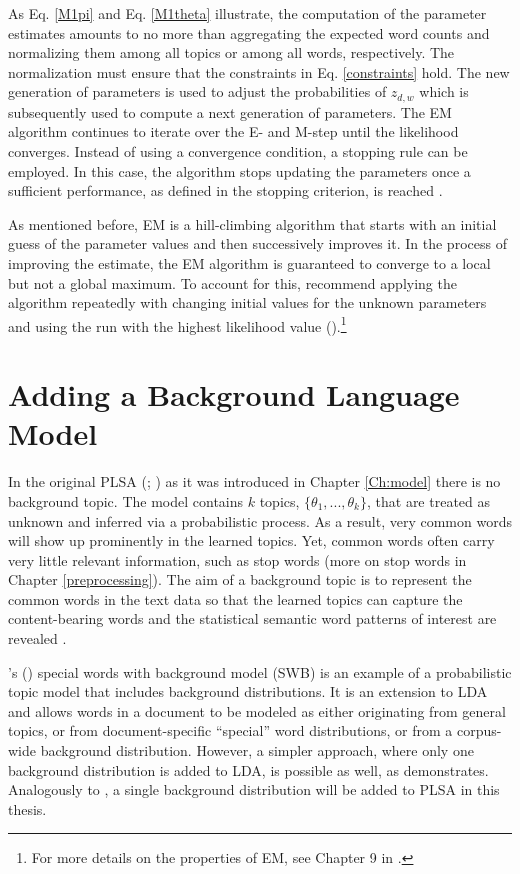 \documentclass[11pt,a4paper,english,oneside]{book}
\numberwithin{equation}{chapter}
\begin{document}
As Eq. \ref{M1pi} and Eq. \ref{M1theta} illustrate, the computation of the parameter estimates amounts to no more than aggregating the expected word counts and normalizing them among all topics or among all words, respectively. The normalization must ensure that the constraints in Eq. \ref{constraints} hold. The new generation of parameters is used to adjust the probabilities of $z_{d,w}$ which is subsequently used to compute a next generation of parameters. The EM algorithm continues to iterate over the E- and M-step until the likelihood converges. Instead of using a convergence condition, a stopping rule can be employed. In this case, the algorithm stops updating the parameters once a sufficient performance, as defined in the stopping criterion, is reached \citep[pp. 182--183]{Hofmann.2001}. 

As mentioned before, EM is a hill-climbing algorithm that starts with an initial guess of the parameter values and then successively improves it. In the process of improving the estimate, the EM algorithm is guaranteed to converge to a local but not a global maximum. To account for this, \citeauthor{Zhai.2016} recommend applying the algorithm repeatedly with changing initial values for the unknown parameters and using the run with the highest likelihood value (\citeyear[pp. 363--368]{Zhai.2016}).\footnote{For more details on the properties of EM, see Chapter 9 in \cite{Bishop.2006}.}

\section{Adding a Background Language Model}\label{Ch:background}


In the original PLSA (\citealp{Hofmann.1999}; \citeyear{Hofmann.2001}) as it was introduced in Chapter \ref{Ch:model} there is no background topic. The model contains $k$ topics, $\{\theta_1, ..., \theta_k\}$, that are treated as unknown and inferred via a probabilistic process. As a result, very common words will show up prominently in the learned topics. Yet, common words often carry very little relevant information, such as stop words (more on stop words in Chapter \ref{preprocessing}). 
The aim of a background topic is to represent the common words in the text data so that the learned topics can capture the content-bearing words and the statistical semantic word patterns of interest are revealed \cite[pp.7--8]{Darling.2011}. 

\citeauthor{Chem.2007}'s (\citeyear{Chem.2007}) special words with background model (SWB) is an example of a probabilistic topic model that includes background distributions. It is an extension to LDA and allows words in a document to be modeled as either originating from general topics, or from document-specific “special” word distributions, or from a corpus-wide background distribution. However, a simpler approach, where only one background distribution is added to LDA, is possible as well, as \citet[pp.7--8]{Darling.2011} demonstrates. Analogously to \cite{Darling.2011}, a single background distribution will be added to PLSA in this thesis.
\end{document}
